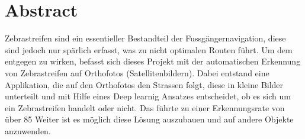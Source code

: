 \chapter*{Abstract}

Zebrastreifen sind ein essentieller Bestandteil der Fussgängernavigation, diese sind jedoch nur spärlich erfasst, was zu nicht optimalen Routen führt. 
Um dem entgegen zu wirken,  befasst sich dieses Projekt mit der automatischen Erkennung von Zebrastreifen auf Orthofotos (Satellitenbildern). 
Dabei entstand eine Applikation, die auf den Orthofotos den Strassen folgt, diese in kleine Bilder unterteilt und mit Hilfe eines Deep learnig Ansatzes entscheidet, ob es sich um ein Zebrastreifen handelt oder nicht.
Das führte zu einer Erkennungsrate von über 85%
Weiter ist es möglich diese Lösung auszubauen und auf andere Objekte anzuwenden.
